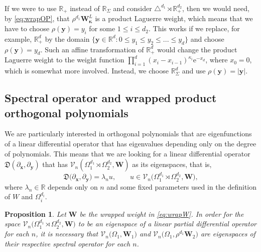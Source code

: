 \documentclass{amsart}
\newtheorem{prop}[thm]{Proposition}
\theoremstyle{remark}
\def\e{\mathrm{e}}
\def\fD{{\mathfrak D}}
\def\k{{\kappa}}
\def\l{{\lambda}}
\def\xb{{\bm x}}
\def\yb{{\bm y}}
\def\Wb{{\bm W}}
\def\CV{{\mathcal V}}
\def\RR{{\mathbb R}}
\def\bk{{\boldsymbol{\kappa}}}
\begin{document}
If we were to use $\RR_+$ instead of $\RR_\Sigma$ and consider $\triangle^{d_1} \rtimes \RR_+^{d_2}$, then 
we would need, by \eqref{eq:wrapOP}, that $\rho^{d_1} \Wb_\bk^L$ is a product Laguerre weight, which 
means that we have to choose $\rho(\yb) = y_i$ for some $1\le i \le d_2$. This works if we replace, for example,
$\RR_+^d$ by the domain $\{\yb \in \RR^d: 0 \le y_1 \le y_2 \le ... \le y_d\}$ and choose $\rho(\yb) = y_d$. Such
an affine transformation of $\RR_+^d$ would change the product Laguerre weight to the weight function
$\prod_{i=1}^{d} (x_i-x_{i-1})^{\k_i} \e^{-x_d}$, where $x_0 =0$, which is somewhat more involved. Instead,
we choose $\RR_\Sigma^d$ and use $\rho(\yb) = |\yb|$.

\subsection{Spectral operator and wrapped product orthogonal polynomials} We are particularly interested in orthogonal
polynomials that are eigenfunctions of a linear differential operator that has eigenvalues depending only on the degree of 
polynomials. This means that we are looking for a linear differential operator  $\fD(\partial_{\xb}, \partial_{\yb})$ that has 
$\CV_n(\Omega_1^{d_1}  \rtimes \Omega_2^{d_2}, \Wb)$ as its eigenspaces, that is,
$$
    \fD\big(\partial_{\xb}, \partial_{\yb}\big) = \l_n u, \qquad  u \in \CV_n\big( \Omega_1^{d_1}  \rtimes \Omega_2^{d_2}, \Wb\big),
$$
where $\l_n \in \RR$ depends only on $n$ and some fixed parameters used in the definition of $W$ and $\Omega_i^{d_i}$. 

\begin{prop}\label{prop:all_operator}
Let $\Wb$ be the wrapped weight in \eqref{eq:wrapW}. In order for the space
$\CV_n\big( \Omega_1^{d_1}  \rtimes \Omega_2^{d_2}, \Wb\big)$ to be an eigenspace of a linear 
partial differential operator for each $n$, it is necessary that 
$\CV_n\big(\Omega_1, \Wb_1\big)$ and $\CV_n\big(\Omega_1, \rho^{d_1} \Wb_2\big)$ are eigenspaces of their
respective spectral operator for each $n$. 
\end{prop}
\end{document}
